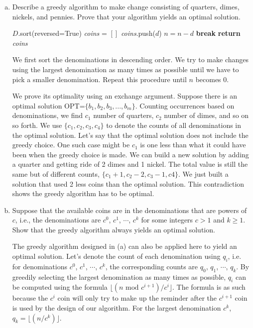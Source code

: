 \documentclass[11pt]{article}
\theoremstyle{definition}
\theoremstyle{theorem}
\newcommand{\solution}{\medskip\noindent{\color{DarkBlue}\textbf{Solution:}}}
\begin{document}
\begin{enumerate}[(a)]
\item Describe a greedy algorithm to make change consisting of quarters, dimes, nickels, and pennies. Prove that your algorithm yields an optimal solution.

\solution
\begin{algorithmic}[1]
 
	\State $D$.sort(reversed=True) 
	\State \textit{coins} = $[]$
			\State \textit{coins}.push($d$)
			\State $n = n - d$
		\EndWhile
			\State \textbf{break}
		\EndIf
	\EndFor
	\State \textbf{return} \textit{coins}
\EndFunction
\end{algorithmic}

We first sort the denominations in descending order. We try to make changes using the largest denomination as many times as possible until we have to pick a smaller denomination. Repeat this procedure until $n$ becomes 0.

We prove its optimality using an exchange argument. Suppose there is an optimal solution OPT=$\{b_1, b_2, b_3, ..., b_m\}$. Counting occurrences based on denominations, we find $c_1$ number of quarters, $c_2$ number of dimes, and so on so forth. We use $\{c_1, c_2, c_3, c_4\}$ to denote the counts of all denominations in the optimal solution. Let's say that the optimal solution does not include the greedy choice. One such case might be $c_1$ is one less than what it could have been when the greedy choice is made. We can build a new solution by adding a quarter and getting ride of 2 dimes and 1 nickel. The total value is still the same but of different counts, $\{c_1 + 1, c_2 - 2, c_3 - 1, c4\}$. We just built a solution that used 2 less coins than the optimal solution. This contradiction shows the greedy algorithm has to be optimal.

\newpage
\item Suppose that the available coins are in the denominations that are powers of $c$, i.e., the denominations are $c^0$, $c^1$, $\cdots$, $c^k$ for some integers $c > 1$ and $k \ge 1$. Show that the greedy algorithm always yields an optimal solution.

\solution

The greedy algorithm designed in (a) can also be applied here to yield an optimal solution. Let's denote the count of each denomination using $q_i$, i.e. for denominations $c^0$, $c^1$, $\cdots$, $c^k$, the corresponding counts are $q_0$, $q_1$, $\cdots$, $q_k$. By greedily selecting the largest denomination as many times as possible, $q_i$ can be computed using the formula $\lfloor (n \text{ mod } c^{i+1})/c^i \rfloor$. The formula is as such because the $c^{i}$ coin will only try to make up the reminder after the $c^{i+1}$ coin is used by the design of our algorithm. For the largest denomination $c^k$, $q_k = \lfloor (n/c^k) \rfloor$. 


\end{enumerate}
\end{document}
